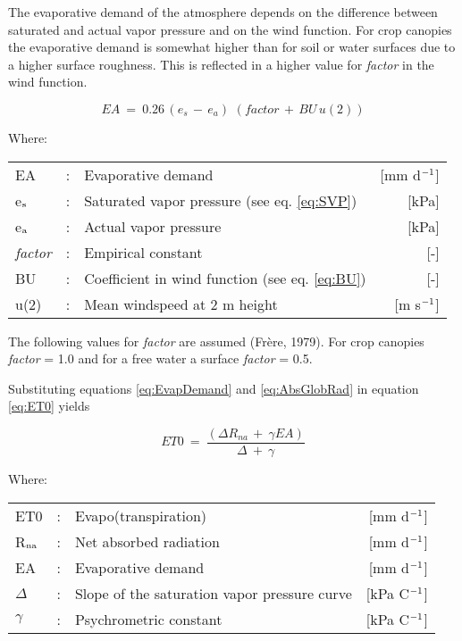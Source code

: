 The evaporative demand of the atmosphere depends on the difference between saturated
and actual vapor pressure and on the wind function. For crop canopies the evaporative
demand is somewhat higher than for soil or water surfaces due to a higher surface
roughness. This is reflected in a higher value for {\it factor} in the wind function.

\begin{equation}
\label{eq:EvapDemand}
EA~=~0.26\, (e _{s} \, -\, e _{a} )\,\, (factor\, +\, BU\, u(2))
\end{equation}

Where:\\[5pt]
\begin{tabularx}{\textwidth}{llXr}
	EA &:& Evaporative demand  & [mm d$^{{\rm -1}}$]\\
	e$_{{\rm s}}$ &:& Saturated vapor pressure (see eq. \ref{eq:SVP})  & [kPa]\\
	e$_{{\rm a}}$ &:& Actual vapor pressure  & [kPa]\\
	{\it factor} &:& Empirical constant  & [-]\\
	BU &:& Coefficient in wind function (see eq. \ref{eq:BU})  & [-]\\
	u(2) &:& Mean windspeed at 2 m height  & [m s$^{{\rm -1}}$]\\
\end{tabularx}

The following values for {\it factor} are assumed (Fr\`{e}re, 1979). For crop canopies {\it factor} =
1.0 and for a free water a surface {\it factor} = 0.5.

Substituting equations \ref{eq:EvapDemand} and \ref{eq:AbsGlobRad} in equation \ref{eq:ET0} yields

\begin{equation}
\label{eq:Penman}
ET0 ~=~{\frac{(\Delta R _{na~} +~\gamma EA)}{\Delta ~+~\gamma }}
\end{equation}

Where:\\[5pt]
\begin{tabularx}{\textwidth}{llXr}
	ET0 &:& Evapo(transpiration)  & [mm d$^{{\rm -1}}$]\\
	R$_{{\rm na}}$ &:& Net absorbed radiation  & [mm d$^{{\rm -1}}$]\\
	EA &:& Evaporative demand  & [mm d$^{{\rm -1}}$]\\
	$\Delta$ &:& Slope of the saturation vapor pressure curve   & [kPa \degrees C$^{{\rm -1}}$]\\
	$\gamma$ &:& Psychrometric constant  & [kPa \degrees C$^{{\rm -1}}$]
\end{tabularx}

